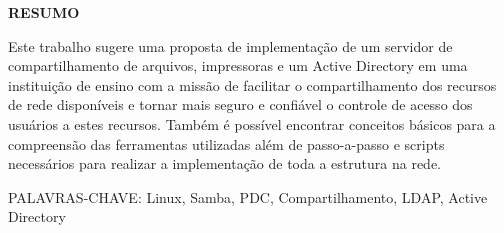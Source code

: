 \begin{center}
\textbf{RESUMO}
\end{center}
\singlespacing

Este trabalho sugere uma proposta de implementação de um servidor de compartilhamento de arquivos, impressoras e um Active Directory em uma instituição de ensino com a missão de facilitar o compartilhamento dos recursos de rede disponíveis e tornar mais seguro e confiável o controle de acesso dos usuários a estes recursos. Também é possível encontrar conceitos básicos para a compreensão das ferramentas utilizadas além de passo-a-passo e scripts necessários para realizar a implementação de toda a estrutura na rede.

\noindent PALAVRAS-CHAVE: Linux, Samba, PDC, Compartilhamento, LDAP, Active Directory
